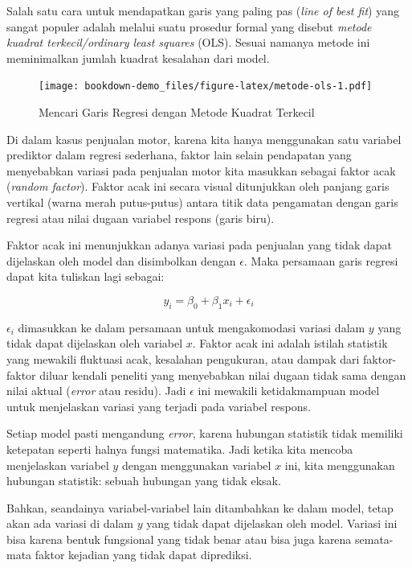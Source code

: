 \documentclass[
]{book}
\begin{document}
Salah satu cara untuk mendapatkan garis yang paling pas (\emph{line of best fit}) yang sangat populer adalah melalui suatu prosedur formal yang disebut \emph{metode kuadrat terkecil/ordinary least squares} (OLS). Sesuai namanya metode ini meminimalkan jumlah kuadrat kesalahan dari model.

\begin{figure}
\centering
\texttt{[image: bookdown-demo\_files/figure-latex/metode-ols-1.pdf]}
\caption{\label{fig:metode-ols}Mencari Garis Regresi dengan Metode Kuadrat Terkecil}
\end{figure}

Di dalam kasus penjualan motor, karena kita hanya menggunakan satu variabel prediktor dalam regresi sederhana, faktor lain selain pendapatan yang menyebabkan variasi pada penjualan motor kita masukkan sebagai faktor acak (\emph{random factor}). Faktor acak ini secara visual ditunjukkan oleh panjang garis vertikal (warna merah putus-putus) antara titik data pengamatan dengan garis regresi atau nilai dugaan variabel respons (garis biru).

Faktor acak ini menunjukkan adanya variasi pada penjualan yang
tidak dapat dijelaskan oleh model dan disimbolkan dengan \(\epsilon\).
Maka persamaan garis regresi dapat kita tuliskan lagi sebagai:

\begin{equation} 
y_i=\beta_0 + \beta_1x_i + \epsilon_i
\label{eq:persamaan-witherror}
\end{equation}

\(\epsilon_i\) dimasukkan ke dalam persamaan untuk mengakomodasi variasi dalam \(y\) yang tidak dapat dijelaskan oleh variabel \(x\). Faktor acak ini adalah istilah
statistik yang mewakili fluktuasi acak, kesalahan pengukuran, atau
dampak dari faktor-faktor diluar kendali peneliti \citep{faraway2016a} yang menyebabkan nilai dugaan tidak sama dengan nilai aktual (\emph{error} atau residu). Jadi
\(\epsilon\) ini mewakili ketidakmampuan model untuk menjelaskan variasi
yang terjadi pada variabel respons.

Setiap model pasti mengandung \emph{error}, karena hubungan statistik tidak
memiliki ketepatan seperti halnya fungsi matematika. Jadi ketika kita
mencoba menjelaskan variabel \(y\) dengan menggunakan variabel \(x\) ini,
kita menggunakan hubungan statistik: sebuah hubungan yang tidak eksak.

Bahkan, seandainya variabel-variabel lain ditambahkan ke dalam model,
tetap akan ada variasi di dalam \(y\) yang tidak dapat dijelaskan oleh
model. Variasi ini bisa karena bentuk fungsional yang tidak benar atau
bisa juga karena semata-mata faktor kejadian yang tidak dapat
diprediksi.
\end{document}
